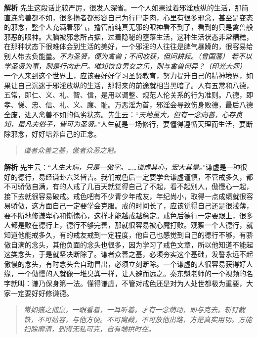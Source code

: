 \textbf{解析} 先生这段话比较严厉，很发人深省。一个人如果过着邪淫放纵的生活，那简直连禽兽都不如，很多撸者都形容自己为行尸走肉，心里有很多邪念，甚至是变态的邪念，整个人充满着邪气，撸管前纯真无邪的眼神看不到了，看到的只是禽兽般邪恶的眼神。大脑被邪念所占据，过着隐秘的堕落生活，这种生活状态非常糟糕，在那种状态下很难体会到生活的美好，一个邪淫的人往往是脾气暴躁的，很容易给别人带去负能量。\textit{不为圣贤，便为禽兽；不问收获，但问耕耘。（曾国藩）} \textit{若不以学圣贤为事，则是行肉走尸。唯知饮食男女之乐，则与禽兽何异？（印光大师）} 一个人来到这个世界上，应该要好好学习圣贤教育，努力提升自己的精神境界，如果让自己沉迷于邪淫放纵的生活，那将来的前途就相当黑暗了。人有五常和八德，五常，即仁、义、礼、智、信，是用以调整、规范人伦关系的行为准则。八德，即孝、悌、忠、信、礼、义、廉、耻。万恶淫为首，邪淫会导致伤身败德，最后八德全废，进入禽兽不如的低劣状态。先生云：“\textit{天地虽大，但有一念向善，心存良知，虽凡夫俗子，皆可为圣贤。}”人生就是一场修行，要懂得遵循天理而生活，要断除邪念，好好培养自己的正念。

\begin{quote}\it
    谦者众善之基，傲者众恶之魁。
\end{quote}

\textbf{解析} 先生云：“\textit{人生大病，只是一傲字。……谦虚其心，宏大其量。}”谦虚是一种很好的德行，易经谦卦六爻皆吉。我们戒色后一定要学会谦虚谨慎，不管戒多久，都不可骄傲自满，有的人戒了几百天就觉得自己了不起，看不起别人，傲慢心一起，接下去就很容易破戒。戒色吧有不少青少年戒友，年纪尚小，取得一点成绩就很容易骄傲，这方面自己一定要学会克服。戒的时间长了，应该觉得自己还是很浅薄，要不断地修谦卑心和惭愧心，这样才能越戒越稳定。戒色后德行一定要跟上，很多人都是败在德行上，德行不够完善，那就很容易被心魔打败。观察一个人德行，就知道他能戒多久，有的戒友戒到一定程度，他自己也感觉到自己的德行不够，有骄傲自满的念头，其他负面的念头也很多，因为学习了戒色文章，所以他知道不能起这类念头，于是就坚决断除了。谦者众善之基，必须夯实这个基础，发誓永远不起傲慢的念头，有时念头会自动冒出，必须立刻断除。一个谦虚的人很容易获得好人缘，一个傲慢的人就像一堆臭粪一样，让人避而远之。秦东魁老师的一个视频的名字就叫：谦乃保身第一法。懂得谦虚，不管对戒色还是对为人处世都极为重要，大家一定要好好修谦德。

\begin{quote}\it
    常如猫之捕鼠，一眼看着，一耳听着。才有一念萌动，即与克去。斩钉截铁，不可姑容，与他方便。不可窝藏，不可放他出路，方是真实用功。方能扫除廓清，到得无私可克，自有端拱时在。
\end{quote}


